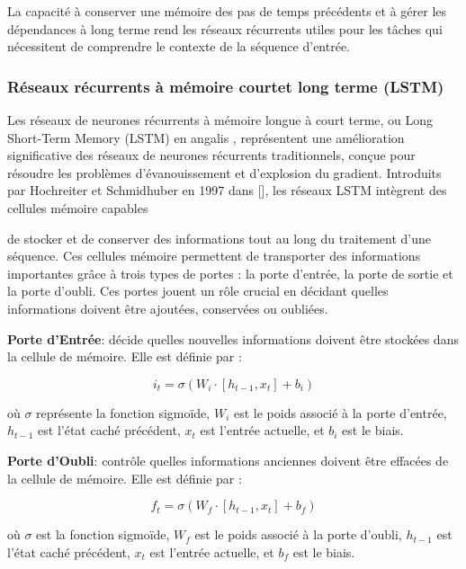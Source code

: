 La capacité à conserver une mémoire des pas de temps précédents et à gérer les
dépendances à long terme rend les réseaux récurrents utiles pour les tâches qui
nécessitent de comprendre le contexte de la séquence d'entrée.

\subsubsection{Réseaux récurrents à mémoire courtet long terme (LSTM) }

Les réseaux de neurones récurrents à mémoire longue à court terme, ou Long
Short-Term Memory (LSTM) en angalis , représentent une amélioration
significative des réseaux de neurones récurrents traditionnels, conçue pour
résoudre les problèmes d’évanouissement et d’explosion du gradient. Introduits
par Hochreiter et Schmidhuber en 1997 dans [\cite{hochreiter1997long}], les
réseaux LSTM intègrent des cellules mémoire capables

de stocker et de conserver des informations tout au long du traitement d’une
séquence. Ces cellules mémoire permettent de transporter des informations
importantes grâce à trois types de portes : la porte d’entrée, la porte de
sortie et la porte d’oubli. Ces portes jouent un rôle crucial en décidant
quelles informations doivent être ajoutées, conservées ou oubliées.

\textbf{Porte d'Entrée}: décide quelles nouvelles informations doivent être stockées dans la cellule de mémoire. Elle est définie par :

\begin{equation}
	i_t = \sigma(W_i \cdot [h_{t-1}, x_t] + b_i)
\end{equation}

où $\sigma$ représente la fonction sigmoïde, $W_i$ est le poids associé à la
porte d'entrée, $h_{t-1}$ est l'état caché précédent, $x_t$ est l'entrée
actuelle, et $b_i$ est le biais.

\textbf{Porte d'Oubli}: contrôle quelles informations anciennes doivent être effacées de la cellule de mémoire. Elle est définie par :

\begin{equation}
	f_t = \sigma(W_f \cdot [h_{t-1}, x_t] + b_f)
\end{equation}

où $\sigma$ est la fonction sigmoïde, $W_f$ est le poids associé à la porte
d'oubli, $h_{t-1}$ est l'état caché précédent, $x_t$ est l'entrée actuelle, et
$b_f$ est le biais.


